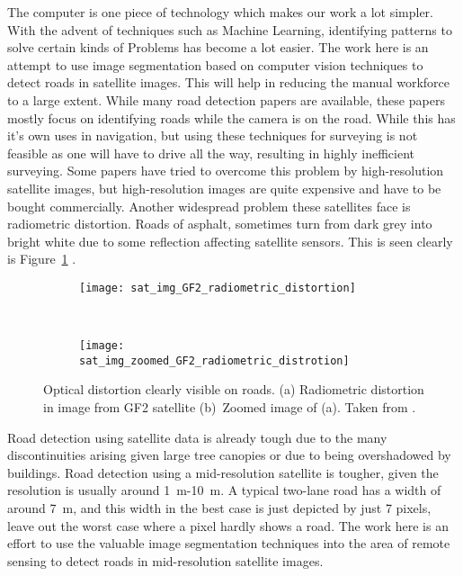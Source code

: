 The computer is one piece of technology which makes our work a lot simpler. With the advent of techniques such as Machine Learning, identifying patterns to solve certain kinds of Problems has become a lot easier. The work here is an attempt to use image segmentation based on computer vision techniques to detect roads in satellite images. This will help in reducing the manual workforce to a large extent. While many road detection papers are available, these papers mostly focus on identifying roads while the camera is on the road. While this has it's own uses in navigation, but using these techniques for surveying is not feasible as one will have to drive all the way, resulting in highly inefficient surveying. Some papers have tried to overcome this problem by high-resolution satellite images, but high-resolution images are quite expensive and have to be bought commercially. Another widespread problem these satellites face is radiometric distortion. Roads of asphalt, sometimes turn from dark grey into bright white due to some reflection affecting satellite sensors. This is seen clearly is Figure~\ref{fig:sat_img_radiometric_distortion} \cite{GF2-imageCaseStudy}. \par

\begin{figure}[t]
  \centering
  \begin{subfigure}{0.5\textwidth}
    \texttt{[image: sat\_img\_GF2\_radiometric\_distortion]}
    \caption{}
  \end{subfigure}~
  \begin{subfigure}{0.5\textwidth}
    \texttt{[image: sat\_img\_zoomed\_GF2\_radiometric\_distrotion]}
    \caption{}
  \end{subfigure}
  \caption[Optical distortion clearly visible on roads]{Optical distortion clearly visible on roads. (a) Radiometric distortion in image from GF2 satellite (b)~Zoomed image of (a). Taken from \cite{GF2-imageCaseStudy}.}%
  \label{fig:sat_img_radiometric_distortion}%
\end{figure}


Road detection using satellite data is already tough due to the many discontinuities arising given large tree canopies or due to being overshadowed by buildings. Road detection using a mid-resolution satellite is tougher, given the resolution is usually around 1~m-10~m. A typical two-lane road has a width of around 7~m, and this width in the best case is just depicted by just 7 pixels, leave out the worst case where a pixel hardly shows a road. The work here is an effort to use the valuable image segmentation techniques into the area of remote sensing to detect roads in mid-resolution satellite images.